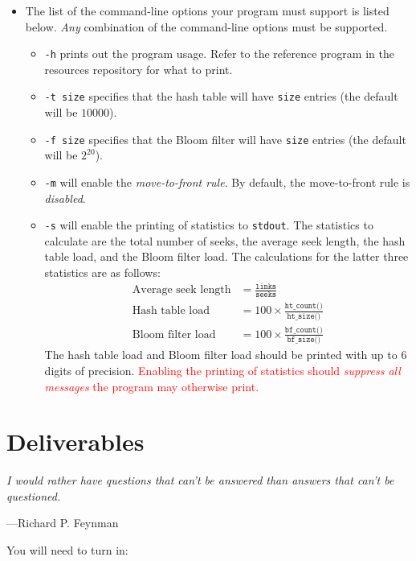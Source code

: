\documentclass{article}
\begin{document}
\begin{itemize}
  \item The list of the command-line options your program must support
    is listed below. \emph{Any} combination of the command-line options
    must be supported.
    \begin{itemize}
      \item \texttt{-h} prints out the program usage. Refer to the
      reference program in the resources repository for what to print.
      \item \texttt{-t size} specifies that the hash table
        will have \texttt{size} entries (the default will be $10000$).
      \item \texttt{-f size} specifies that the Bloom filter
        will have \texttt{size} entries (the default will be $2^{20}$).
      \item \texttt{-m} will enable the \emph{move-to-front rule}. By
        default, the move-to-front rule is \emph{disabled}.
      \item \texttt{-s} will enable the printing of statistics to
        \texttt{stdout}. The statistics to calculate are the total
        number of seeks, the average seek length, the hash table load,
        and the Bloom filter load. The calculations for the latter three
        statistics are as follows:
        \begin{align*}
          \text{Average seek length} &=
          \frac{\texttt{links}}{\texttt{seeks}} \\
          \text{Hash table load} &= 100 \times \frac{\texttt{ht\_count()}}{\texttt{ht\_size()}} \\
          \text{Bloom filter load} &= 100 \times \frac{\texttt{bf\_count()}}{\texttt{bf\_size()}}
        \end{align*}
        The hash table load and Bloom filter load should be printed with
        up to 6 digits of precision. \textcolor{red}{Enabling the
        printing of statistics should \emph{suppress all messages} the
      program may otherwise print.}
    \end{itemize}
\end{itemize}


\section{Deliverables}

\epigraph{\emph{I would rather have questions that can't be answered than
answers that can't be questioned.}}{---Richard P. Feynman}

You will need to turn in:
\end{document}
